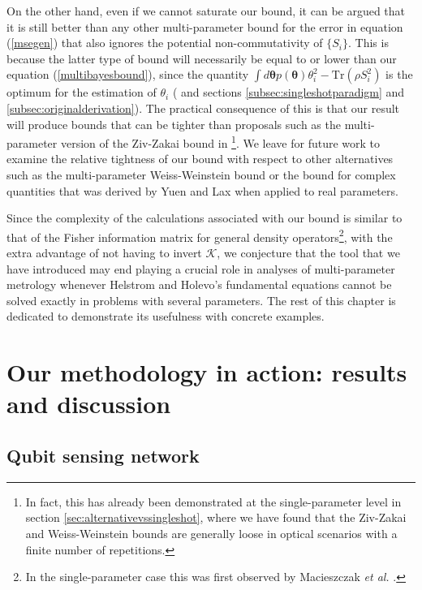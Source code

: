 On the other hand, even if we cannot saturate our bound, it can be argued that it is still better than any other multi-parameter bound for the error in equation (\ref{msegen}) that also ignores the potential non-commutativity of $\lbrace S_i \rbrace$. This is because the latter type of bound will necessarily be equal to or lower than our equation (\ref{multibayesbound}), since the quantity $\int d\boldsymbol{\theta} p(\boldsymbol{\theta})\theta_i^2 - \mathrm{Tr}\left(\rho S_i^2\right)$ is the optimum for the estimation of $\theta_i$ (\cite{personick1971, yuen1973, helstrom1976} and sections \ref{subsec:singleshotparadigm} and \ref{subsec:originalderivation}). The practical consequence of this is that our result will produce bounds that can be tighter than proposals such as the multi-parameter version of the Ziv-Zakai bound in \cite{zhang2014}\footnote{In fact, this has already been demonstrated at the single-parameter level in section \ref{sec:alternativevssingleshot}, where we have found that the Ziv-Zakai and Weiss-Weinstein bounds \cite{tsang2012, tsang2016} are generally loose in optical scenarios with a finite number of repetitions.}. We leave for future work to examine the relative tightness of our bound with respect to other alternatives such as the multi-parameter Weiss-Weinstein bound \cite{tsang2016} or the bound for complex quantities that was derived by Yuen and Lax \cite{yuen1973} when applied to real parameters. 
 
Since the complexity of the calculations associated with our bound is similar to that of the Fisher information matrix for general density operators\footnote{In the single-parameter case this was first observed by Macieszczak \emph{et al.} \cite{macieszczak2014bayesian}.}, with the extra advantage of not having to invert $\mathcal{K}$, we conjecture that the tool that we have introduced may end playing a crucial role in analyses of multi-parameter metrology whenever Helstrom and Holevo's fundamental equations cannot be solved exactly in problems with several parameters. The rest of this chapter is dedicated to demonstrate its usefulness with concrete examples. 

\section{Our methodology in action: results and discussion}

\subsection{Qubit sensing network}
\label{subsec:multibayesqubit}

